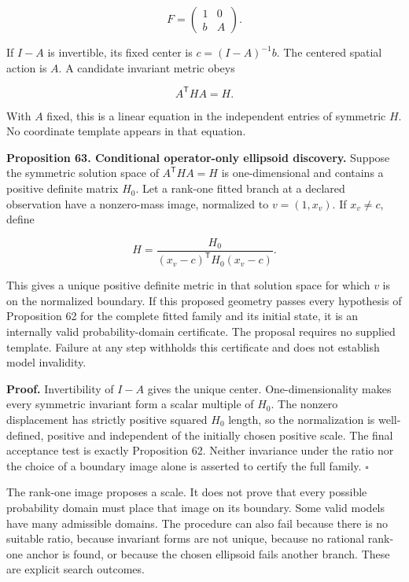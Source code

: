 \[
F=\begin{pmatrix}1&0\\b&A\end{pmatrix}.
\]

If \(I-A\) is invertible, its fixed center is \(c=(I-A)^{-1}b\). The
centered spatial action is \(A\). A candidate invariant metric obeys

\[
A^{\mathsf T}HA=H.
\]

With \(A\) fixed, this is a linear equation in the independent entries
of symmetric \(H\). No coordinate template appears in that equation.

\textbf{Proposition 63. Conditional operator-only ellipsoid discovery.}
Suppose the symmetric solution space of \(A^{\mathsf T}HA=H\) is
one-dimensional and contains a positive definite matrix \(H_0\). Let a
rank-one fitted branch at a declared observation have a nonzero-mass
image, normalized to \(v=(1,x_v)\). If \(x_v\neq c\), define

\[
H=\frac{H_0}{(x_v-c)^{\mathsf T}H_0(x_v-c)}.
\]

This gives a unique positive definite metric in that solution space for
which \(v\) is on the normalized boundary. If this proposed geometry
passes every hypothesis of Proposition 62 for the complete fitted family
and its initial state, it is an internally valid probability-domain
certificate. The proposal requires no supplied template. Failure at any
step withholds this certificate and does not establish model invalidity.

\textbf{Proof.} Invertibility of \(I-A\) gives the unique center.
One-dimensionality makes every symmetric invariant form a scalar
multiple of \(H_0\). The nonzero displacement has strictly positive
squared \(H_0\) length, so the normalization is well-defined, positive
and independent of the initially chosen positive scale. The final
acceptance test is exactly Proposition 62. Neither invariance under the
ratio nor the choice of a boundary image alone is asserted to certify
the full family. \(\square\)

The rank-one image proposes a scale. It does not prove that every
possible probability domain must place that image on its boundary. Some
valid models have many admissible domains. The procedure can also fail
because there is no suitable ratio, because invariant forms are not
unique, because no rational rank-one anchor is found, or because the
chosen ellipsoid fails another branch. These are explicit search
outcomes.

